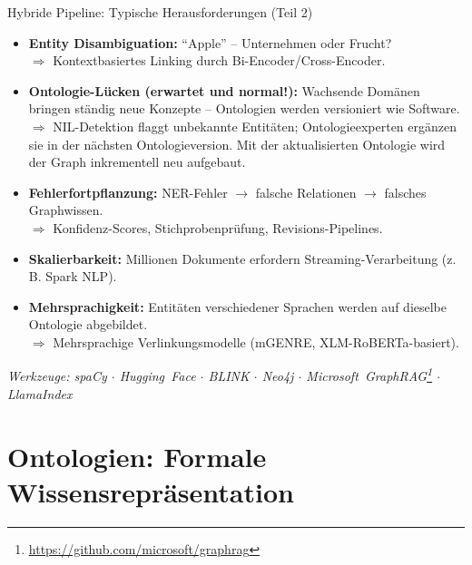 \documentclass[aspectratio=1610, xcolor=dvipsnames, 9pt]{beamer}
\begin{document}
\begin{frame}{Hybride Pipeline: Typische Herausforderungen (Teil 2)}
  \begin{itemize}
    \item \textbf{Entity Disambiguation:} ``Apple'' -- Unternehmen oder Frucht?\\
      $\Rightarrow$ Kontextbasiertes Linking durch Bi-Encoder/Cross-Encoder.
    \item \textbf{Ontologie-Lücken (erwartet und normal!):} Wachsende Domänen bringen ständig neue Konzepte -- Ontologien werden versioniert wie Software.\\
      $\Rightarrow$ NIL-Detektion flaggt unbekannte Entitäten; Ontologieexperten ergänzen sie in der nächsten Ontologieversion. Mit der aktualisierten Ontologie wird der Graph inkrementell neu aufgebaut.
    \item \textbf{Fehlerfortpflanzung:} NER-Fehler $\rightarrow$ falsche Relationen $\rightarrow$ falsches Graphwissen.\\
      $\Rightarrow$ Konfidenz-Scores, Stichprobenprüfung, Revisions-Pipelines.
    \item \textbf{Skalierbarkeit:} Millionen Dokumente erfordern Streaming-Verarbeitung (z.\,B. Spark NLP).
    \item \textbf{Mehrsprachigkeit:} Entitäten verschiedener Sprachen werden auf dieselbe Ontologie abgebildet.\\
      $\Rightarrow$ Mehrsprachige Verlinkungsmodelle (mGENRE, XLM-RoBERTa-basiert).
  \end{itemize}
  \vspace{0.2cm}
  \begin{center}
    \footnotesize\textit{Werkzeuge: spaCy $\cdot$ Hugging~Face $\cdot$ BLINK $\cdot$ Neo4j $\cdot$ Microsoft~GraphRAG\footnote{\url{https://github.com/microsoft/graphrag}} $\cdot$ LlamaIndex}
  \end{center}
\end{frame}

\section{Ontologien: Formale Wissensrepräsentation}
\end{document}
